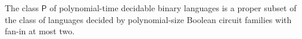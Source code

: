 \begin{theorem}
\label{Complexity.P_ssubset_PPoly}
\leanok
{}
The class $\mathsf{P}$ of polynomial-time decidable binary languages is a proper subset
of the class of languages decided by polynomial-size Boolean circuit families with
fan-in at most two.
\end{theorem}
